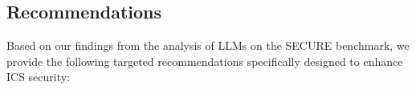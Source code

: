 \documentclass[conference]{IEEEtran}
\begin{document}
\begin{table}[]
\centering 
\caption{Average performance of human subjects on the subset of SECURE benchmark}
\label{tab:humaneval}
\end{table}
 


\subsection{Recommendations}
Based on our findings from the analysis of LLMs on the SECURE benchmark, we provide the following targeted recommendations specifically designed to enhance ICS security:
\end{document}
